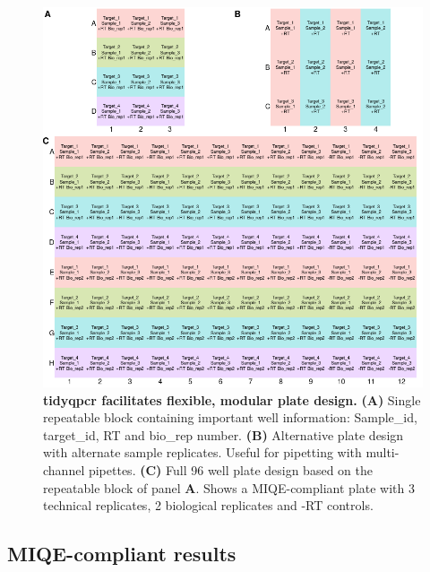 \documentclass{SBCbookchapter}
\begin{document}
\begin{figure}[H]

{\centering \includegraphics[width=1\linewidth]{figures/combined_plate_plans.png} 

}

\caption{\textbf{tidyqpcr facilitates flexible, modular plate design.} \textbf{(A)} Single repeatable block containing important well information: Sample\_id, target\_id, RT and bio\_rep number. \textbf{(B)} Alternative plate design with alternate sample replicates. Useful for pipetting with multi-channel pipettes. \textbf{(C)} Full 96 well plate design based on the repeatable block of panel \textbf{A}. Shows a MIQE-compliant plate with 3 technical replicates, 2 biological replicates and -RT controls.} \label{fig:combined-plate-design}
\end{figure}



\subsection{MIQE-compliant results}
\end{document}
